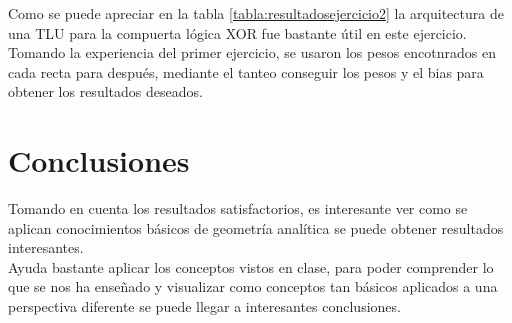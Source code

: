 \documentclass[12pt,twoside]{article}
\begin{document}
\begin{table}[htbp]
    \centering
    \caption{Resultados del ejercicio 2.}
    \label{tabla:resultadosejercicio2}
\end{table}
Como se puede apreciar en la tabla \ref{tabla:resultadosejercicio2}
la arquitectura de una TLU para la compuerta lógica XOR fue bastante útil
en este ejercicio.\\

Tomando la experiencia del primer ejercicio, se usaron los pesos encotnrados
en cada recta para después, mediante el tanteo conseguir los pesos y el bias
para obtener los resultados deseados.

\section{Conclusiones}
Tomando en cuenta los resultados satisfactorios, es interesante ver como 
se aplican conocimientos básicos de geometría analítica se puede obtener
resultados interesantes.\\
Ayuda bastante aplicar los conceptos vistos en clase, para poder
comprender lo que se nos ha enseñado y visualizar como conceptos tan
básicos aplicados a una perspectiva diferente se puede llegar a interesantes
conclusiones.
\end{document}

